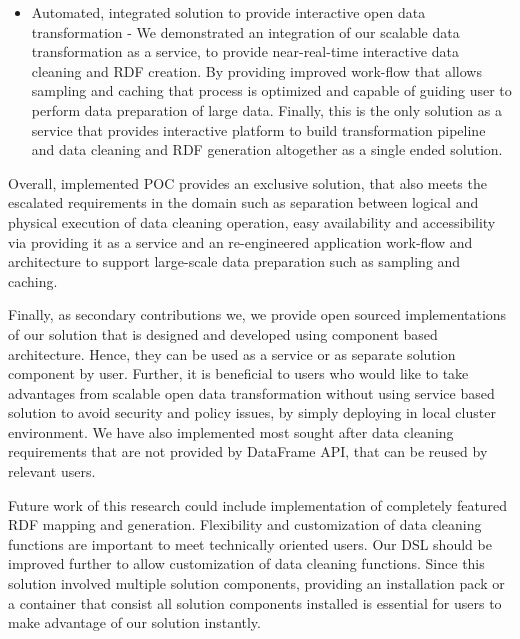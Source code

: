 \begin{itemize}
\item Automated, integrated solution to provide interactive open data transformation - We demonstrated an integration of our scalable data transformation as a service, to provide near-real-time interactive data cleaning and RDF creation. By providing improved work-flow that allows sampling and caching that process is optimized and capable of guiding user to perform data preparation of large data. Finally, this is the only solution as a service that provides interactive platform to build transformation pipeline and data cleaning and RDF generation altogether as a single ended solution.
\end{itemize}
Overall, implemented POC provides an exclusive solution, that also meets the escalated requirements in the domain such as separation between logical and physical execution of data cleaning operation, easy availability and accessibility via providing it as a service and an re-engineered application work-flow and architecture to support large-scale data preparation such as sampling and caching. 
 
Finally, as secondary contributions we, we provide open sourced implementations of our solution that is designed and developed using component based architecture. Hence, they can be used as a service or as separate solution component by user. Further, it is beneficial to users who would like to take advantages from scalable open data transformation without using service based solution to avoid security and policy issues, by simply deploying in local cluster environment. We have also implemented most sought after data cleaning requirements that are not provided by DataFrame API, that can be reused by relevant users. 

Future work of this research could include implementation of completely featured RDF mapping and generation. Flexibility and customization of data cleaning functions are important to meet technically oriented users. Our DSL should be improved further to allow customization of data cleaning functions. Since this solution involved multiple solution components, providing an installation pack or a container that consist all solution components installed is essential for users to make advantage of our solution instantly.  

